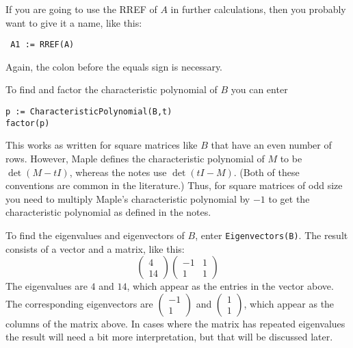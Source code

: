 \documentclass{amsart}
\begin{document}
If you are going to use the RREF of $A$ in further calculations, then
you probably want to give it a name, like this:
\begin{verbatim}
 A1 := RREF(A)
\end{verbatim}
Again, the colon before the equals sign is necessary.

To find and factor the characteristic polynomial of $B$ you can enter 
\begin{verbatim}
p := CharacteristicPolynomial(B,t)
factor(p)
\end{verbatim}
This works as written for square matrices like $B$ that have an even
number of rows.  However, Maple defines the characteristic polynomial
of $M$ to be $\det(M-tI)$, whereas the notes use $\det(tI-M)$.  (Both
of these conventions are common in the literature.)  Thus, for square
matrices of odd size you need to multiply Maple's characteristic
polynomial by $-1$ to get the characteristic polynomial as defined in
the notes.  

To find the eigenvalues and eigenvectors of $B$, enter
\verb|Eigenvectors(B)|.  The result consists of a vector and a matrix,
like this:
\[ \begin{pmatrix} 4\\ 14\end{pmatrix}
   \begin{pmatrix} -1&1 \\ 1&1 \end{pmatrix}
\]
The eigenvalues are $4$ and $14$, which appear as the entries in the
vector above.  The corresponding eigenvectors are
$\begin{pmatrix}-1\\1\end{pmatrix}$ and
$\begin{pmatrix}1\\1\end{pmatrix}$, which appear as the columns of the
matrix above.  In cases where the matrix has repeated eigenvalues the
result will need a bit more interpretation, but that will be discussed
later.
\end{document}
